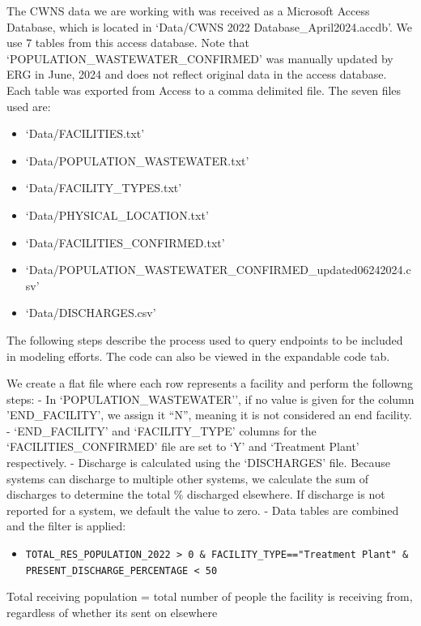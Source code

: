 \documentclass[
  letterpaper,
  DIV=11,
  numbers=noendperiod]{scrartcl}
\providecommand{\tightlist}{%
  \setlength{\itemsep}{0pt}\setlength{\parskip}{0pt}}\usepackage{longtable,booktabs,array}
\begin{document}
The CWNS data we are working with was received as a Microsoft Access
Database, which is located in `Data/CWNS 2022
Database\_April2024.accdb'. We use 7 tables from this access database.
Note that `POPULATION\_WASTEWATER\_CONFIRMED' was manually updated by
ERG in June, 2024 and does not reflect original data in the access
database. Each table was exported from Access to a comma delimited file.
The seven files used are:

\begin{itemize}
\tightlist
\item
  `Data/FACILITIES.txt'
\item
  `Data/POPULATION\_WASTEWATER.txt'
\item
  `Data/FACILITY\_TYPES.txt'
\item
  `Data/PHYSICAL\_LOCATION.txt'
\item
  `Data/FACILITIES\_CONFIRMED.txt'
\item
  `Data/POPULATION\_WASTEWATER\_CONFIRMED\_updated06242024.csv'
\item
  `Data/DISCHARGES.csv'
\end{itemize}

The following steps describe the process used to query endpoints to be
included in modeling efforts. The code can also be viewed in the
expandable code tab.

We create a flat file where each row represents a facility and perform
the followng steps: - In `POPULATION\_WASTEWATER'', if no value is given
for the column 'END\_FACILITY', we assign it ``N'', meaning it is not
considered an end facility. - `END\_FACILITY' and `FACILITY\_TYPE'
columns for the `FACILITIES\_CONFIRMED' file are set to `Y' and
`Treatment Plant' respectively. - Discharge is calculated using the
`DISCHARGES' file. Because systems can discharge to multiple other
systems, we calculate the sum of discharges to determine the total \%
discharged elsewhere. If discharge is not reported for a system, we
default the value to zero. - Data tables are combined and the filter is
applied:

\begin{itemize}
\tightlist
\item
  \texttt{TOTAL\_RES\_POPULATION\_2022\ \textgreater{}\ 0\ \&\ FACILITY\_TYPE=="Treatment\ Plant"\ \&\ PRESENT\_DISCHARGE\_PERCENTAGE\ \textless{}\ 50}
\end{itemize}

Total receiving population = total number of people the facility is
receiving from, regardless of whether its sent on elsewhere
\end{document}
